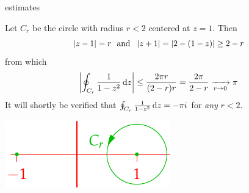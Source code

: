 \begin{examples}{}{estimates}
\begin{enumerate}
  \begin{minipage}[t]{0.65\linewidth}\vspace{0pt}
\item\label{ex:estimates3} Let $C_r$ be the circle with radius $r<2$ centered at $z=1$. Then
  \[\nm{z-1}=r\ \text{ and }\ \nm{z+1}=\nm{2-(1-z)}\ge 2-r\]
  from which
  \[\left| \oint_{C_r}\frac 1{1-z^2}\,{\mathrm{d} z}\right|\le\frac{2\pi r}{(2-r)r}=\frac{2\pi}{2-r}\xrightarrow[r\to 0]{}\pi\]
  It will shortly be verified that $\oint_{C_r}\frac 1{1-z^2}\,{\mathrm{d} z}=
  -\pi i$ for \emph{any} $r<2$.
\end{minipage}\begin{minipage}[t]{0.35\linewidth}\vspace{0pt}
\flushright\includegraphics{bound-ex2}
\end{minipage}
\end{enumerate}
\end{examples}


